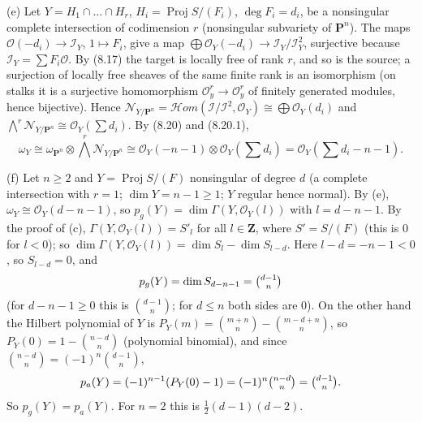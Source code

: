 \documentclass[11pt]{article}
\begin{document}
(e) Let $Y=H_1\cap\dots\cap H_r$, $H_i=\operatorname{Proj}S/(F_i)$, $\deg F_i=d_i$, be a nonsingular complete intersection of codimension $r$ (nonsingular subvariety of $\mathbf P^n$). The maps $\mathcal O(-d_i)\to\mathcal I_Y$, $1\mapsto F_i$, give a map $\bigoplus\mathcal O_Y(-d_i)\to\mathcal I_Y/\mathcal I_Y^2$, surjective because $\mathcal I_Y=\sum F_i\mathcal O$. By (8.17) the target is locally free of rank $r$, and so is the source; a surjection of locally free sheaves of the same finite rank is an isomorphism (on stalks it is a surjective homomorphism $\mathcal O_y^r\to\mathcal O_y^r$ of finitely generated modules, hence bijective). Hence $\mathcal N_{Y/\mathbf P^n}=\mathcal{H}om(\mathcal I/\mathcal I^2,\mathcal O_Y)\cong\bigoplus\mathcal O_Y(d_i)$ and $\bigwedge^r\mathcal N_{Y/\mathbf P^n}\cong\mathcal O_Y(\sum d_i)$. By (8.20) and (8.20.1),
\[\omega_Y\cong\omega_{\mathbf P^n}\otimes\textstyle\bigwedge^r\mathcal N_{Y/\mathbf P^n}\cong\mathcal O_Y(-n-1)\otimes\mathcal O_Y(\sum d_i)=\mathcal O_Y(\sum d_i-n-1).\]

(f) Let $n\ge2$ and $Y=\operatorname{Proj}S/(F)$ nonsingular of degree $d$ (a complete intersection with $r=1$; $\dim Y=n-1\ge1$; $Y$ regular hence normal). By (e), $\omega_Y\cong\mathcal O_Y(d-n-1)$, so $p_g(Y)=\dim\Gamma(Y,\mathcal O_Y(l))$ with $l=d-n-1$. By the proof of (c), $\Gamma(Y,\mathcal O_Y(l))=S'_l$ for all $l\in\mathbf Z$, where $S'=S/(F)$ (this is $0$ for $l<0$); so $\dim\Gamma(Y,\mathcal O_Y(l))=\dim S_l-\dim S_{l-d}$. Here $l-d=-n-1<0$, so $S_{l-d}=0$, and
\[p_g(Y)=\dim S_{d-n-1}=\tbinom{d-1}{n}\]
(for $d-n-1\ge0$ this is $\binom{d-1}n$; for $d\le n$ both sides are $0$). On the other hand the Hilbert polynomial of $Y$ is $P_Y(m)=\binom{m+n}n-\binom{m-d+n}n$, so $P_Y(0)=1-\binom{n-d}{n}$ (polynomial binomial), and since $\binom{n-d}n=(-1)^n\binom{d-1}n$,
\[p_a(Y)=(-1)^{n-1}(P_Y(0)-1)=(-1)^{n}\tbinom{n-d}n=\tbinom{d-1}n.\]
So $p_g(Y)=p_a(Y)$. For $n=2$ this is $\frac12(d-1)(d-2)$.
\end{document}

